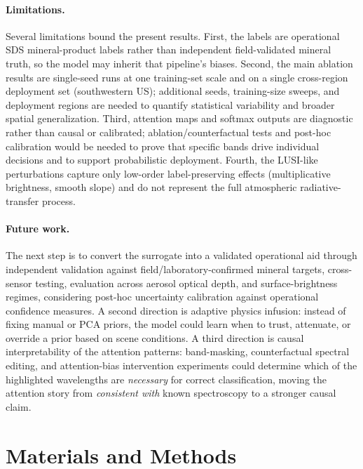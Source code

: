 \documentclass[11pt]{article}
\begin{document}
\paragraph{Limitations.}
Several limitations bound the present results.
First, the labels are operational SDS mineral-product labels rather than independent field-validated mineral truth, so the model may inherit that pipeline's biases.
Second, the main ablation results are single-seed runs at one training-set scale and on a single cross-region deployment set (southwestern US); additional seeds, training-size sweeps, and deployment regions are needed to quantify statistical variability and broader spatial generalization.
Third, attention maps and softmax outputs are diagnostic rather than causal or calibrated; ablation/counterfactual tests and post-hoc calibration would be needed to prove that specific bands drive individual decisions and to support probabilistic deployment.
Fourth, the LUSI-like perturbations capture only low-order label-preserving effects (multiplicative brightness, smooth slope) and do not represent the full atmospheric radiative-transfer process.

\paragraph{Future work.}
The next step is to convert the surrogate into a validated operational aid through independent validation against field/laboratory-confirmed mineral targets, cross-sensor testing, evaluation across aerosol optical depth, and surface-brightness regimes, considering post-hoc uncertainty calibration against operational confidence measures.
A second direction is adaptive physics infusion: instead of fixing manual or PCA priors, the model could learn when to trust, attenuate, or override a prior based on scene conditions.
A third direction is causal interpretability of the attention patterns: band-masking, counterfactual spectral editing, and attention-bias intervention experiments could determine which of the highlighted wavelengths are \emph{necessary} for correct classification, moving the attention story from \emph{consistent with} known spectroscopy to a stronger causal claim.

\section{Materials and Methods}
\end{document}
